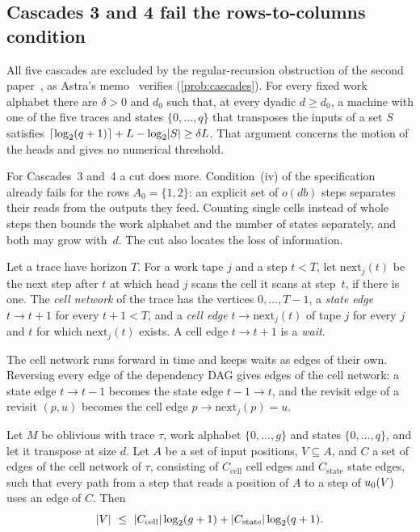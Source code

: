 \subsection{Cascades 3 and 4 fail the rows-to-columns condition}\label{sec:cascade-cuts}

All five cascades are excluded by the regular-recursion obstruction of the second paper~\cite[Theorem~7.5]{SecondPaper2026}, as Astra's
memo~\cite{CascadeObstructionMemo2026} verifies (\cref{prob:cascades}). For every fixed work alphabet there are $\delta>0$ and $d_0$ such that, at
every dyadic $d\ge d_0$, a machine with one of the five traces and states $\{0,\dots,q\}$ that transposes the inputs of a set $S$
satisfies $\lceil \log_2 (q+1) \rceil+L-\log_2\lvert S \rvert\ge\delta L$. That argument concerns the motion of the heads and gives no numerical threshold.

For Cascades~3 and~4 a cut does more. Condition~(iv) of the specification already fails for the rows $A_0=\{1,2\}$: an explicit set
of $o(db)$ steps separates their reads from the outputs they feed. Counting single cells instead of whole steps then bounds the work
alphabet and the number of states separately, and both may grow with~$d$. The cut also locates the loss of information.

\begin{definition}\label{def:cellnet}
Let a trace have horizon $T$. For a work tape $j$ and a step $t<T$, let $\mathrm{next}_j(t)$ be the next step after $t$ at which head
$j$ scans the cell it scans at step~$t$, if there is one. The \emph{cell network} of the trace has the vertices $0,\dots,T-1$, a
\emph{state edge} $t\to t+1$ for every $t+1<T$, and a \emph{cell edge} $t\to\mathrm{next}_j(t)$ of tape $j$ for every $j$ and $t$ for which
$\mathrm{next}_j(t)$ exists. A cell edge $t\to t+1$ is a \emph{wait}.
\end{definition}

The cell network runs forward in time and keeps waits as edges of their own. Reversing every edge of the dependency DAG gives edges of
the cell network: a state edge $t\to t-1$ becomes the state edge $t-1\to t$, and the revisit edge of a revisit $(p,u)$ becomes the cell
edge $p\to\mathrm{next}_j(p)=u$.

\begin{lemma}\label{lem:cellcut}
\notformalized
Let $M$ be oblivious with trace $\tau$, work alphabet $\{0,\dots,g\}$ and states $\{0,\dots,q\}$, and let it transpose at size $d$.
Let $A$ be a set of input positions, $V\subseteq A$, and $C$ a set of edges of the cell network of $\tau$, consisting of $C_{\mathrm{cell}}$
cell edges and $C_{\mathrm{state}}$ state edges, such that every path from a step that reads a position of $A$ to a step of $u_0(V)$
uses an edge of $C$. Then
\[
  \abs V\ \le\ \abs{C_{\mathrm{cell}}}\log_2(g+1)+\abs{C_{\mathrm{state}}}\log_2(q+1).
\]
\end{lemma}

